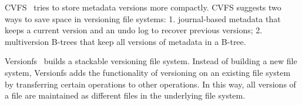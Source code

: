 CVFS~\citep{cvfs} tries to store metadata versions more compactly.
CVFS suggests two ways to save space in versioning file systems:
1. journal-based metadata that keeps a current version and an undo log to
recover previous versions;
2. multiversion B-trees that keep all versions of metadata in a B-tree.

Versionfs~\citep{versionfs} builds a stackable versioning file system.
Instead of building a new file system, Versionfs adds the functionality of
versioning on an existing file system by transferring certain operations to
other operations.
In this way, all versions of a file are maintained as different files in the
underlying file system.
